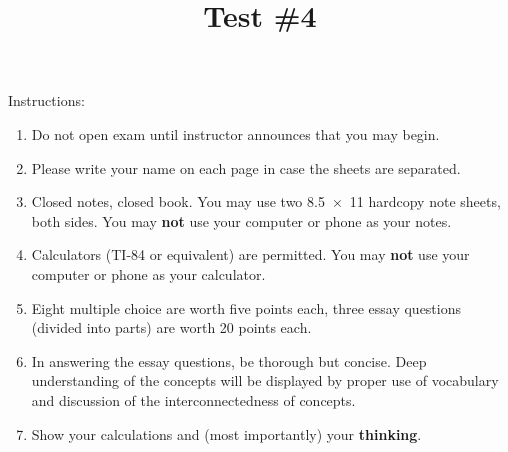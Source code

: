 \documentclass[exam,addpoints, noanswers]{exam}
\title{Test \#4}
\date{\printdate{6/2/2021}}
\author{\mobeardInstructorShort}
\begin{document}
\maketitle
\vfill
\mobeardExamNameBlock
\vfill
Instructions: 
\begin{enumerate}
\item Do not open exam until instructor announces that you may begin.
\item Please write your name on each page in case the sheets are separated. 
\item Closed notes, closed book.  You may use two \SI{8.5x11}{\inch} hardcopy note sheets, both sides. You may \textbf{not} use your computer or phone as your notes. 
\item Calculators (TI-84 or equivalent) are permitted.  You may \textbf{not} use your computer or phone as your calculator. 
\item Eight multiple choice are worth five points each, three essay questions (divided into parts) are worth 20 points each. 
\item In answering the essay questions, be thorough but concise. Deep understanding of the concepts will be displayed by proper use of vocabulary and discussion of the interconnectedness of concepts. 
\item Show your calculations and (most importantly) your \textbf{thinking}.
\end{enumerate}
\vfill
\begin{center}
\gradetable[h][questions]
\end{center}
\clearpage
\end{document}
